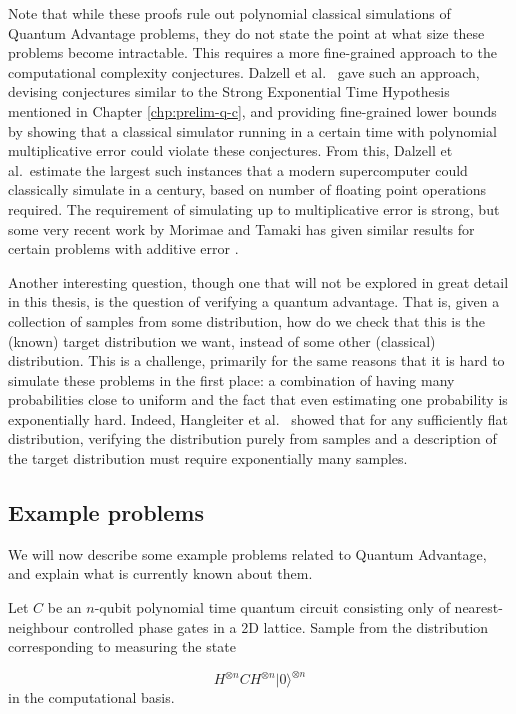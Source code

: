 Note that while these proofs rule out polynomial classical simulations of Quantum Advantage problems, they do not state the point at what size these problems become intractable. This requires a more fine-grained approach to the computational complexity conjectures. Dalzell et al.~\cite{dalzell2017, dalzell2018} gave such an approach, devising conjectures similar to the Strong Exponential Time Hypothesis mentioned in Chapter \ref{chp:prelim-q-c}, and providing fine-grained lower bounds by showing that a classical simulator running in a certain time with polynomial multiplicative error could violate these conjectures. From this, Dalzell et al.\ estimate the largest such instances that a modern supercomputer could classically simulate in a century, based on number of floating point operations required. The requirement of simulating up to multiplicative error is strong, but some very recent work by Morimae and Tamaki has given similar results for certain problems with additive error \cite{morimae2019}.

Another interesting question, though one that will not be explored in great detail in this thesis, is the question of verifying a quantum advantage. That is, given a collection of samples from some distribution, how do we check that this is the (known) target distribution we want, instead of some other (classical) distribution. This is a challenge, primarily for the same reasons that it is hard to simulate these problems in the first place: a combination of having many probabilities close to uniform and the fact that even estimating one probability is exponentially hard. Indeed, Hangleiter et al.~\cite{hangleiter2019} showed that for any sufficiently flat distribution, verifying the distribution purely from samples and a description of the target distribution must require exponentially many samples.

\subsection{Example problems}
\label{ssec:qa-examples}

We will now describe some example problems related to Quantum Advantage, and explain what is currently known about them.

\begin{problem} Let $C$ be an $n$-qubit polynomial time quantum circuit consisting only of nearest-neighbour controlled phase gates in a 2D lattice. Sample from the distribution corresponding to measuring the state

\begin{equation}
H^{\otimes n}CH^{\otimes n}|0\rangle^{\otimes n}
\end{equation}
\noindent in the computational basis.
\end{problem}

